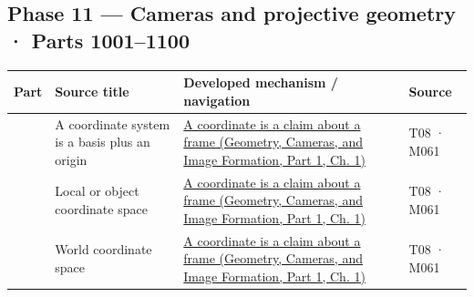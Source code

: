 \subsection{Phase 11 --- Cameras and projective geometry · Parts 1001--1100}\label{appendix-fd090d982a15-phase-11-cameras-and-projective-geometry-parts-10011100}

\hypertarget{appendix-fd090d982a15-phase-11-cameras-and-projective-geometry-parts-10011100}{}

{\def\LTcaptype{none} %
\begin{longtable}[]{@{}
  >{\raggedleft\arraybackslash}p{}
  >{\raggedright\arraybackslash}p{}
  >{\raggedright\arraybackslash}p{}
  >{\raggedright\arraybackslash}p{}@{}}
\toprule\noalign{}
\begin{minipage}[b]{\linewidth}\raggedleft
Part
\end{minipage} & \begin{minipage}[b]{\linewidth}\raggedright
Source title
\end{minipage} & \begin{minipage}[b]{\linewidth}\raggedright
Developed mechanism / navigation
\end{minipage} & \begin{minipage}[b]{\linewidth}\raggedright
Source
\end{minipage} \\
\midrule\noalign{}
\endhead
\bottomrule\noalign{}
\endlastfoot
1001 & A coordinate system is a basis plus an origin & \href{../03-Geometry-Cameras-and-Image-Formation-P01/main.pdf\#nameddest=02-foundations-ii-ch032-a-coordinate-is-a-claim-about-a-frame}{A coordinate is a claim about a frame (Geometry, Cameras, and Image Formation, Part 1, Ch. 1)} & T08 · M061 \\
1002 & Local or object coordinate space & \href{../03-Geometry-Cameras-and-Image-Formation-P01/main.pdf\#nameddest=02-foundations-ii-ch032-a-coordinate-is-a-claim-about-a-frame}{A coordinate is a claim about a frame (Geometry, Cameras, and Image Formation, Part 1, Ch. 1)} & T08 · M061 \\
1003 & World coordinate space & \href{../03-Geometry-Cameras-and-Image-Formation-P01/main.pdf\#nameddest=02-foundations-ii-ch032-a-coordinate-is-a-claim-about-a-frame}{A coordinate is a claim about a frame (Geometry, Cameras, and Image Formation, Part 1, Ch. 1)} & T08 · M061 \\

\end{longtable}}
